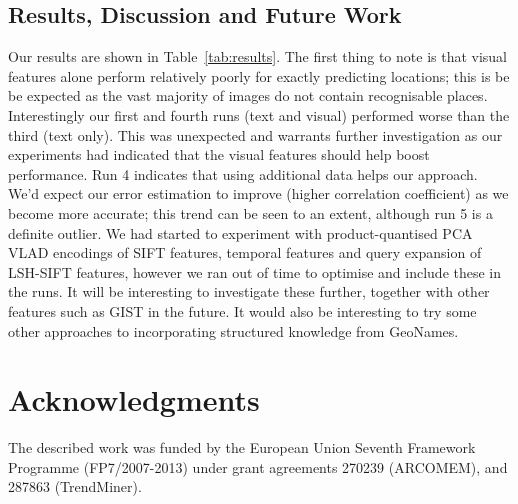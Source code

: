 \documentclass{../acm_proc_article-me11_tweaked}
\begin{document}
\subsection{Results, Discussion and Future Work}
Our results are shown in Table~\ref{tab:results}. The first thing to note is that visual features alone perform relatively poorly for exactly predicting locations; this is be be expected as the vast majority of images do not contain recognisable places. Interestingly our first and fourth runs (text and visual) performed worse than the third (text only). This was unexpected and warrants further investigation as our experiments had indicated that the visual features should help boost performance. Run 4 indicates that using additional data helps our approach. We'd expect our error estimation to improve (higher correlation coefficient) as we become more accurate; this trend can be seen to an extent, although run 5 is a definite outlier. 
We had started to experiment with product-quantised PCA VLAD encodings of SIFT features, temporal features and query expansion of LSH-SIFT features, however we ran out of time to optimise and include these in the runs. It will be interesting to investigate these further, together with other features such as GIST in the future. It would also be interesting to try some other approaches to incorporating structured knowledge from GeoNames.

\section{Acknowledgments}
The described work was funded by the European Union Seventh Framework Programme (FP7/2007-2013) under grant agreements 270239 (ARCOMEM), and 287863 (TrendMiner).




\end{document}
